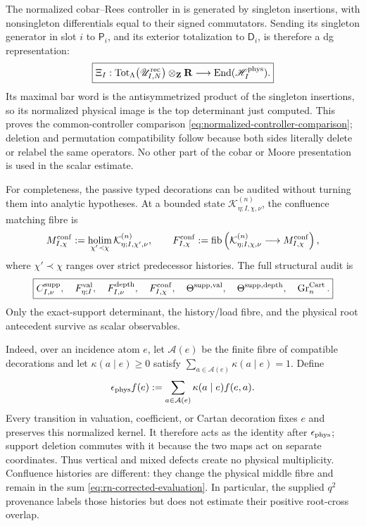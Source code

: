 \documentclass[11pt]{article}
\newcommand{\R}{\mathbf R}
\newcommand{\supp}{\mathrm{supp}}
\newcommand{\holim}{\operatorname*{holim}}
\newcommand{\fib}{\operatorname{fib}}
\begin{document}
The normalized cobar--Rees controller in \cite{UnifiedTower} is generated by
singleton insertions, with nonsingleton differentials equal to their signed
commutators.  Sending its singleton generator in slot \(i\) to
\(\mathsf P_i\), and its exterior totalization to \(\mathsf D_i\), is therefore
a dg representation:
\begin{equation}\label{eq:global-fsc-physical-koszul-comparison}
 \boxed{
 \Xi_I:
 \operatorname{Tot}_{\Lambda}
 \bigl(\mathscr U^{\rm rec}_{I,N}\bigr)\otimes_{\mathbf Z}\R
 \longrightarrow
 \operatorname{End}(\mathscr H_I^{\rm phys}).}
\end{equation}
Its maximal bar word is the antisymmetrized product of the singleton
insertions, so its normalized physical image is the top determinant just
computed.  This proves the common-controller comparison
\eqref{eq:normalized-controller-comparison}; deletion and permutation
compatibility follow because both sides literally delete or relabel the same
operators.  No other part of the cobar or Moore presentation is used in the
scalar estimate.

For completeness, the passive typed decorations can be audited without
turning them into analytic hypotheses.  At a bounded state
\(\mathcal K^{(n)}_{\eta;I,\chi,\nu}\), the confluence matching fibre is
\begin{equation}\label{eq:confluence-matching-defect}
 M^{\rm conf}_{I,\chi}
 :=
 \holim_{\chi'\prec\chi}
 \mathcal K_{\eta;I,\chi',\nu}^{(n)},
 \qquad
 F^{\rm conf}_{I,\chi}
 :=
 \fib\left(
 \mathcal K_{\eta;I,\chi,\nu}^{(n)}
 \longrightarrow M^{\rm conf}_{I,\chi}
 \right),
\end{equation}
where \(\chi'\prec\chi\) ranges over strict predecessor histories.  The full
structural audit is
\begin{equation}\label{eq:complete-obstruction-list}
 \boxed{
 C^{\supp}_{I,\nu},\quad
 F^{\rm val}_{\eta;I},\quad
 F^{\rm depth}_{I,\nu},\quad
 F^{\rm conf}_{I,\chi},\quad
 \Theta^{\supp,\rm val},\quad
 \Theta^{\supp,\rm depth},\quad
 \operatorname{Gr}^{\rm Cart}_{n}.}
\end{equation}
Only the exact-support determinant, the history/load fibre, and the physical
root antecedent survive as scalar observables.

Indeed, over an incidence atom \(e\), let \(\mathcal A(e)\) be the finite fibre
of compatible decorations and let
\(\kappa(a\mid e)\ge0\) satisfy
\(\sum_{a\in\mathcal A(e)}\kappa(a\mid e)=1\).  Define
\begin{equation}\label{eq:physical-vertical-augmentation}
 \epsilon_{\rm phys}f(e)
 :=
 \sum_{a\in\mathcal A(e)}\kappa(a\mid e)f(e,a).
\end{equation}
Every transition in valuation, coefficient, or Cartan decoration fixes \(e\)
and preserves this normalized kernel.  It therefore acts as the identity
after \(\epsilon_{\rm phys}\); support deletion commutes with it because the
two maps act on separate coordinates.  Thus vertical and mixed defects create
no physical multiplicity.  Confluence histories are different: they change
the physical middle fibre and remain in the sum
\eqref{eq:rn-corrected-evaluation}.  In particular, the supplied \(q^2\)
provenance labels those histories but does not estimate their positive
root-cross overlap.
\end{document}
